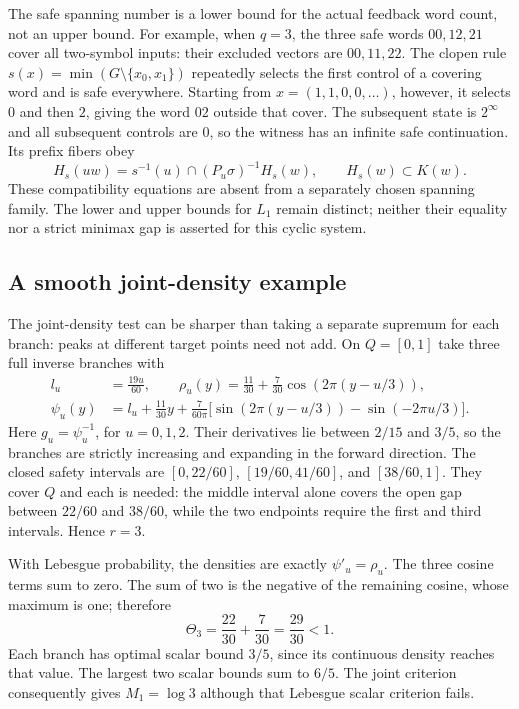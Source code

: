 \documentclass[11pt,reqno]{amsart}
\numberwithin{equation}{section}
\theoremstyle{definition}
\theoremstyle{definition}
\begin{document}
The safe spanning number is a lower bound for the actual feedback
word count, not an upper bound. For example, when $q=3$, the
three safe words $00,12,21$ cover all two-symbol inputs: their
excluded vectors are $00,11,22$. The clopen rule
$s(x)=\min(G\setminus\{x_0,x_1\})$ repeatedly selects the
first control of a covering word and is safe everywhere.
Starting from $x=(1,1,0,0,\ldots)$, however, it selects $0$
and then $2$, giving the word $02$ outside that cover.
The subsequent state is $2^\infty$ and all subsequent controls
are $0$, so the witness has an infinite safe continuation.
Its prefix fibers obey
\[
 H_s(uw)=s^{-1}(u)\cap(P_u\sigma)^{-1}H_s(w),
 \qquad H_s(w)\subset K(w).
\]
These compatibility equations are absent from a separately
chosen spanning family. The lower and upper bounds for $L_1$
remain distinct; neither their equality nor a strict minimax
gap is asserted for this cyclic system.


\subsection{A smooth joint-density example}\label{subsec:smooth}
The joint-density test can be sharper than taking a separate
supremum for each branch: peaks at different target points need not
add. On $Q=[0,1]$ take three full inverse branches with
\begin{align}
 l_u&=\frac{19u}{60},\qquad
 \rho_u(y)=\frac{11}{30}+\frac7{30}
            \cos(2\pi(y-u/3)),\label{eq:smooth-rho}\\
 \psi_u(y)&=l_u+\frac{11}{30}y+
 \frac7{60\pi}\big[\sin(2\pi(y-u/3))-\sin(-2\pi u/3)\big].
 \nonumber
\end{align}
Here $g_u=\psi_u^{-1}$, for $u=0,1,2$.
Their derivatives lie between $2/15$ and $3/5$, so the branches
are strictly increasing and expanding in the forward direction.
The closed safety intervals are
$[0,22/60]$, $[19/60,41/60]$, and $[38/60,1]$.
They cover $Q$ and each is needed: the middle interval alone covers
the open gap between $22/60$ and $38/60$, while the two endpoints
require the first and third intervals. Hence $r=3$.

With Lebesgue probability, the densities are exactly
$\psi'_u=\rho_u$. The three cosine terms sum to zero. The sum of
two is the negative of the remaining cosine, whose maximum is one;
therefore
\[
 \Theta_3=\frac{22}{30}+\frac7{30}=\frac{29}{30}<1.
\]
Each branch has optimal scalar bound $3/5$, since its continuous
density reaches that value. The largest two scalar bounds sum to
$6/5$. The joint criterion consequently gives $M_1=\log3$ although
that Lebesgue scalar criterion fails.
\end{document}

